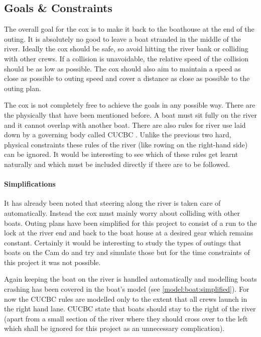       \subsection{Goals \& Constraints}
      The overall goal for the cox is to make it back to the boathouse at the end of the outing. It is absolutely no good to leave a boat stranded in the middle of the river. Ideally the cox should be safe, so avoid hitting the river bank or colliding with other crews. If a collision is unavoidable, the relative speed of the collision should be as low as possible. The cox should also aim to maintain a speed as close as possible to outing speed and cover a distance as close as possible to the outing plan.
      
      The cox is not completely free to achieve the goals in any possible way. There are the physically that have been mentioned before. A boat must sit fully on the river and it cannot overlap with another boat. There are also rules for river use laid down by a governing body called CUCBC \cite{CUCBC}. Unlike the previous two hard, physical constraints these rules of the river (like rowing on the right-hand side) can be ignored. It would be interesting to see which of these rules get learnt naturally and which must be included directly if there are to be followed.
      
      \paragraph{Simplifications}
      It has already been noted that steering along the river is taken care of automatically. Instead the cox must mainly worry about colliding with other boats. Outing plans have been simplified for this project to consist of a run to the lock at the river end and back to the boat house at a desired gear which remains constant. Certainly it would be interesting to study the types of outings that boats on the Cam do and try and simulate those but for the time constraints of this project it was not possible.
      
      Again keeping the boat on the river is handled automatically and modelling boats crashing has been covered in the boat's model (see \ref{model:boat:simplified}). For now the CUCBC rules are modelled only to the extent that all crews launch in the right hand lane. CUCBC state that boats should stay to the right of the river (apart from a small section of the river where they should cross over to the left which shall be ignored for this project as an unnecessary complication).
      

